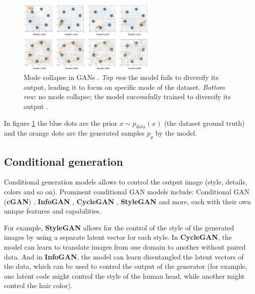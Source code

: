 \begin{figure}
    \centering
    \includegraphics[width=0.6\textwidth]{images/gan/gan_mode_collapse.png}
    \caption{Mode collapse in GANs \cite{gan_mode_collapse_image_source}. \textit{Top row} the model fails to diversify its output, leading it to focus on specific mode of the dataset. \textit{Bottom row}: no mode collapse; the model successfully trained to diversify its output \cite{gan_mode_collapse_image_source}.}
    \label{fig:gan_mode_collapse}
\end{figure}

In figure \ref{fig:gan_mode_collapse} the blue dots are the prior $x \sim p_{\text{data}}(x)$ (the dataset ground truth) and the orange dots are the generated samples $p_g$ by the model.




\subsection{Conditional generation}
\label{subsec:gan_conditional_generation}

Conditional generation models allows to control the output image (style, details, colors and so on). Prominent conditional GAN models include: Conditional GAN (\textbf{cGAN}) \cite{cgan}, \textbf{InfoGAN} \cite{infogan}, \textbf{CycleGAN} \cite{cyclegan}, \textbf{StyleGAN} \cite{stylegan} and more, each with their own unique features and capabilities. 

For example, \textbf{StyleGAN} allows for the control of the style of the generated images by using a separate latent vector for each style. In \textbf{CycleGAN}, the model can learn to translate images from one domain to another without paired data. And in \textbf{InfoGAN}, the model can learn disentangled the latent vectors of the data, which can be used to control the output of the generator (for example, one latent code might control the style of the human head, while another might control the hair color).

